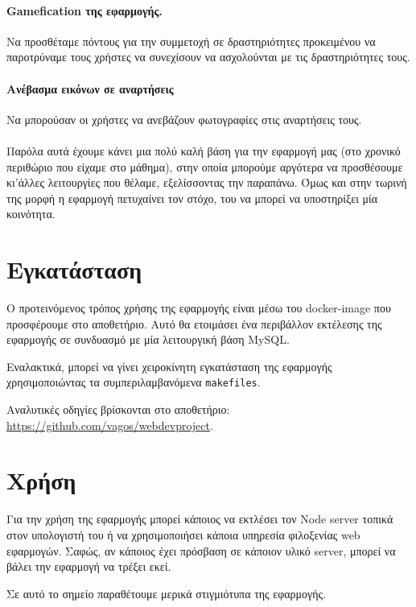 \documentclass[nonacm, language=english, language=greek]{acmart}
\newcommand{\en}[1]{\textlatin{#1}}
\newcommand{\src}[1]{\texttt{\en{#1}}}
\begin{document}
\paragraph*{\en{Gamefication} της εφαρμογής.} 
Να προσθέταμε πόντους για την συμμετοχή σε δραστηριότητες προκειμένου να παροτρύναμε τους χρήστες να συνεχίσουν να ασχολούνται με τις δραστηριότητες τους.
\paragraph*{Ανέβασμα εικόνων σε αναρτήσεις} 
Να μπορούσαν οι χρήστες	να ανεβάζουν φωτογραφίες στις αναρτήσεις τους.
\\
\\
Παρόλα αυτά έχουμε κάνει μια πολύ καλή βάση για την εφαρμογή μας (στο χρονικό περιθώριο που είχαμε στο μάθημα), στην οποία μπορούμε αργότερα να προσθέσουμε κι'άλλες λειτουργίες που θέλαμε, εξελίσσοντας την παραπάνω. 
Όμως και στην τωρινή της μορφή η εφαρμογή πετυχαίνει τον στόχο, του να μπορεί να υποστηρίξει μία κοινότητα.






\appendix

\section{Εγκατάσταση}

Ο προτεινόμενος τρόπος χρήσης της εφαρμογής είναι μέσω 
του \en{docker-image} που προσφέρουμε στο αποθετήριο. 
Αυτό θα ετοιμάσει ένα περιβάλλον εκτέλεσης της εφαρμογής 
σε συνδυασμό με μία λειτουργική βάση \en{MySQL}. 

Εναλακτικά, μπορεί να γίνει χειροκίνητη εγκατάσταση της εφαρμογής 
χρησιμοποιώντας τα συμπεριλαμβανόμενα \src{makefiles}.

Αναλυτικές οδηγίες βρίσκονται στο αποθετήριο: \en{\url{https://github.com/vagos/webdevproject}}.

\section{Χρήση}

Για την χρήση της εφαρμογής μπορεί κάποιος να εκτλέσει 
τον \en{Node server} τοπικά στον υπολογιστή του ή 
να χρησιμοποιήσει κάποια υπηρεσία φιλοξενίας 
\en{web} εφαρμογών. Σαφώς, αν κάποιος έχει πρόσβαση
σε κάποιον υλικό \en{server}, μπορεί να 
βάλει την εφαρμογή να τρέξει εκεί.

Σε αυτό το σημείο παραθέτουμε μερικά στιγμιότυπα 
της εφαρμογής.
\end{document}
